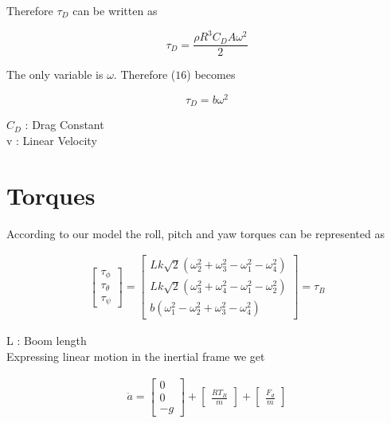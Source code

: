 \documentclass[9pt]{article}
\begin{document}
\noindent Therefore $\tau_{D}$ can be written as

\begin{equation}
\tau_{D} = \frac{\rho R^{3} C_{D}A \omega^{2}}{2}
\end{equation}

\noindent The only variable is $\omega$. Therefore ($16$) becomes

\begin{equation}
\tau_{D} = b\omega^{2}
\end{equation}
 
\noindent $C_{D}$ : Drag Constant \\
v : Linear Velocity

\section{Torques}
\noindent According to our model the roll, pitch and yaw torques can be represented as

\begin{eqnarray}
\left[
\begin{matrix}
\tau_{\phi}\\
\tau_{\theta}\\
\tau_{\psi}
\end{matrix}
\right]=
\left[
\begin{matrix}
Lk\sqrt{2} (\omega_{2}^{2} + \omega_{3}^{2} - \omega_{1}^{2} - \omega_{4}^{2}) \\
Lk\sqrt{2} (\omega_{3}^{2} + \omega_{4}^{2} - \omega_{1}^{2} - \omega_{2}^{2}) \\
b(\omega_{1}^{2} - \omega_{2}^{2} + \omega_{3}^{2} - \omega_{4}^{2})
\end{matrix}
\right]=
\tau_{B}
\end{eqnarray}

\noindent L : Boom length\\

\noindent Expressing linear motion in the inertial frame we get

\begin{eqnarray}
\ddot{a} =
\left[
\begin{matrix}
0 \\
0 \\
-g
\end{matrix}
\right]+
\left[
\begin{matrix}
\frac{RT_{B}}{m}
\end{matrix}
\right]+
\left[
\begin{matrix}
\frac{F_{d}}{m}
\end{matrix}
\right]
\end{eqnarray}
\end{document}
